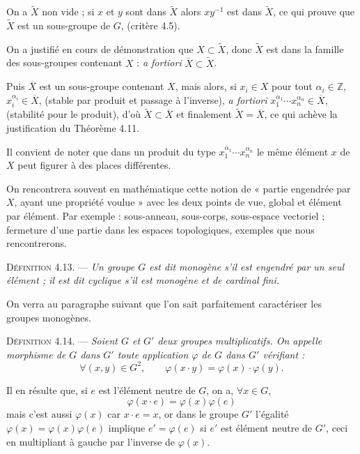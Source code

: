 On a $\widetilde X$ non vide ; si $x$ et $y$ sont dans $\widetilde X$ alors $xy^{-1}$ est dans $\widetilde X$, ce qui prouve que $\widetilde X$ est un sous-groupe de $G$, (critère 4.5).

On a justifié en cours de démonstration que $X\subset\widetilde X$, donc $\widetilde X$ est dans la famille des sous-groupes contenant $X$ : \emph{a fortiori} $\overline X\subset\widetilde X$.

Puis $\overline X$ est un sous-groupe contenant $X$, mais alors, si $x_i\in X$ pour tout $\alpha_i\in\mathbb Z$, $x_i^{\alpha_i}\in\overline X$, (stable par produit et passage à l'inverse), \emph{a fortiori} $x_1^{\alpha_1}\cdots x_n^{\alpha_n}\in\overline X$, (stabilité pour le produit), d'où $\widetilde X\subset\overline X$ et finalement $\widetilde X=\overline X$, ce qui achève la justification du Théorème 4.11. \bookend

Il convient de noter que dans un produit du type $x_1^{\alpha_1}\cdots x_n^{\alpha_n}$ le même élément $x$ de $X$ peut figurer à des places différentes.

On rencontrera souvent en mathématique cette notion de « partie engendrée par $X$, ayant une propriété voulue » avec les deux points de vue, global et élément par élément. Par exemple : sous-anneau, sous-corps, sous-espace vectoriel ; fermeture d'une partie dans les espaces topologiques, exemples que nous rencontrerons.

\medskip\noindent\textsc{Définition 4.13.} --- \emph{Un groupe $G$ est dit monogène s'il est engendré par un seul élément ; il est dit cyclique s'il est monogène et de cardinal fini.}

On verra au paragraphe suivant que l'on sait parfaitement caractériser les groupes monogènes.


\medskip\noindent\textsc{Définition 4.14.} --- \emph{Soient $G$ et $G'$ deux groupes multiplicatifs. On appelle morphisme de $G$ dans $G'$ toute application $\varphi$ de $G$ dans $G'$ vérifiant :
\[
\forall(x,y)\in G^2,\qquad \varphi(x\cdot y)=\varphi(x)\cdot\varphi(y).
\]}

Il en résulte que, si $e$ est l'élément neutre de $G$, on a, $\forall x\in G$,
\[
\varphi(x\cdot e)=\varphi(x)\varphi(e)
\]
mais c'est aussi $\varphi(x)$ car $x\cdot e=x$, or dans le groupe $G'$ l'égalité $\varphi(x)=\varphi(x)\varphi(e)$ implique $e'=\varphi(e)$ si $e'$ est élément neutre de $G'$, ceci en multipliant à gauche par l'inverse de $\varphi(x)$.

